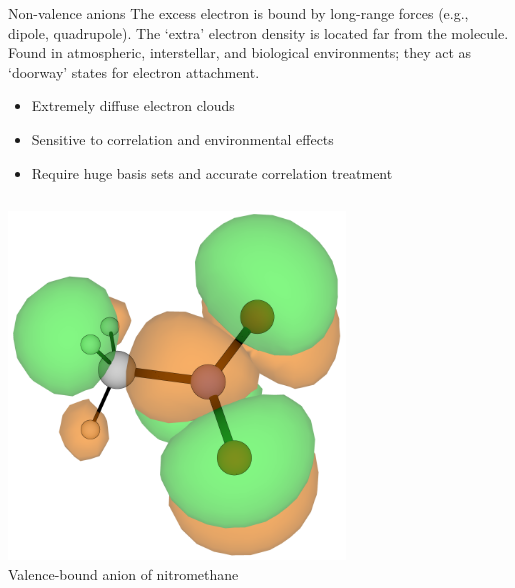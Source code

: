 \documentclass[9pt,t,xcolor=table]{beamer}
\begin{document}
\begin{frame}{\huge Non-valence anions}\large
    \vspace{5pt}
	The excess electron is bound by long-range forces (e.g., dipole, quadrupole). The `extra' electron density is located far from the molecule.\\
	Found in atmospheric, interstellar, and biological environments; they act as `doorway' states for electron attachment. 
    \begin{itemize} 

            \item Extremely diffuse electron clouds
            \item Sensitive to correlation and environmental effects
            \item Require huge basis sets and accurate correlation treatment
    \end{itemize}
    \vspace{5pt}
	\begin{columns}
		\begin{column}{0.27\textwidth}
			\centering
			\includegraphics[width=0.7\textwidth]{Figs/MeNO2_VBS.png}\\
			\vspace{3pt}
			\small Valence-bound anion of nitromethane
		\end{column}
		\begin{column}{0.3\textwidth}
			\centering

\end{column}
\end{columns}
\end{frame}
\end{document}
